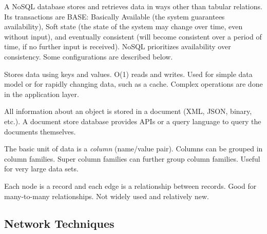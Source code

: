 \begin{description}
\begin{description}[7mm]
	\end{description}
	
	\item[NoSQL] A NoSQL database stores and retrieves data in ways other than tabular relations. Its transactions are BASE: Basically Available (the system guarantees availability), Soft state (the state of the system may change over time, even without input), and eventually consistent (will become consistent over a period of time, if no further input is received). NoSQL prioritizes availability over consistency. Some configurations are described below.
	\begin{description}[7mm]
		\item[Key-value store] Stores data using keys and values. O(1) reads and writes. Used for simple data model or for rapidly changing data, such as a cache. Complex operations are done in the application layer.
		\item[Document store] All information about an object is stored in a document (XML, JSON, binary, etc.). A document store database provides APIs or a query language to query the documents themselves.
		\item[Wide column store] The basic unit of data is a \textit{column} (name/value pair). Columns can be grouped in column families. Super column families can further group column families. Useful for very large data sets.
		\item[Graph database] Each node is a record and each edge is a relationship between records. Good for many-to-many relationships. Not widely used and relatively new.
	\end{description}
\end{description}


\subsection{Network Techniques}

